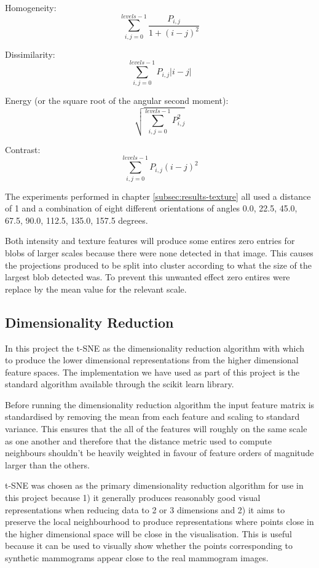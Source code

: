 Homogeneity:
\begin{equation}
	\sum\limits_{i,j=0}^{levels-1} \frac{P_{i,j}}{1+(i-j)^2}
\end{equation}

Dissimilarity:
\begin{equation}
	\sum\limits_{i,j=0}^{levels-1} P_{i,j}|i-j|
\end{equation}

Energy (or the square root of the angular second moment):
\begin{equation}
	\sqrt{ \sum\limits_{i,j=0}^{levels-1} P_{i,j}^2 }
\end{equation}

Contrast:
\begin{equation}
	\sum\limits_{i,j=0}^{levels-1} P_{i,j}(i-j)^2
\end{equation}

The experiments performed in chapter \ref{subsec:results-texture} all used a distance of 1 and a combination of eight different orientations of angles 0.0, 22.5, 45.0, 67.5, 90.0, 112.5, 135.0, 157.5 degrees.

Both intensity and texture features will produce some entires zero entries for blobs of larger scales because there were none detected in that image. This causes the projections produced to be split into cluster according to what the size of the largest blob detected was. To prevent this unwanted effect zero entires were replace by the mean value for the relevant scale.

\subsection{Dimensionality Reduction}
In this project the t-SNE as the dimensionality reduction algorithm with which to produce the lower dimensional representations from the higher dimensional feature spaces. The implementation we have used as part of this project is the standard algorithm available through the scikit learn library. 

Before running the dimensionality reduction algorithm the input feature matrix is standardised by removing the mean from each feature and scaling to standard variance. This ensures that the all of the features will roughly on the same scale as one another and therefore that the distance metric used to compute neighbours shouldn't be heavily weighted in favour of feature orders of magnitude larger than the others.

t-SNE was chosen as the primary dimensionality reduction algorithm for use in this project because 1) it generally produces reasonably good visual representations when reducing data to 2 or 3 dimensions and 2) it aims to preserve the local neighbourhood to produce representations where points close in the higher dimensional space will be close in the visualisation. This is useful because it can be used to visually show whether the points corresponding to synthetic mammograms appear close to the real mammogram images.

